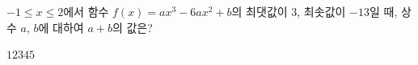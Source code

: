$-1\le x\le 2$에서 함수 $f(x)=ax^3-6ax^2+b$의 최댓값이 $3$, 최솟값이 $-13$일 때, 상수 $a$, $b$에 대하여 $a+b$의 값은? 
\begin{choices32}{$1$}{$2$}{$3$}{$4$}{$5$}\end{choices32}
